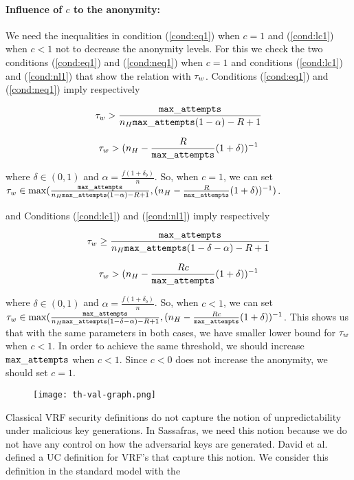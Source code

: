 \paragraph{Influence of $ c $ to the anonymity:} We need the inequalities in condition  (\ref{cond:eq1}) when $ c = 1 $ and (\ref{cond:lc1}) when $ c < 1 $ not to decrease the anonymity levels. For this we check the two conditions (\ref{cond:eq1})  and (\ref{cond:neq1}) when $ c = 1 $ and conditions (\ref{cond:lc1}) and (\ref{cond:nl1}) that show the relation with $ \tau_w $. Conditions (\ref{cond:eq1})  and (\ref{cond:neq1}) imply respectively 

$$\tau_w > \frac{\mathtt{max\_attempts}}{n_H \mathtt{max\_attempts} (1-\alpha)-R +1}$$


$$  \tau_w >({n_H -\frac{R}{\mathtt{max\_attempts}} (1+\delta)})^{-1}$$

where $ \delta \in (0,1) $ and $ \alpha = \frac{f(1+\delta_b)}{n} $. 
So, when $ c = 1 $, we can set  $ \tau_w \in \max( \frac{\mathtt{max\_attempts}}{n_H \mathtt{max\_attempts} (1-\alpha)-R +1}, ({n_H -\frac{R}{\mathtt{max\_attempts}} (1+\delta)})^{-1}) $.

and Conditions  (\ref{cond:lc1})  and (\ref{cond:nl1}) imply respectively 

$$\tau_w \geq \frac{\mathtt{max\_attempts}}{n_H  \mathtt{max\_attempts} (1-\delta-\alpha)-R +1}$$


$$  \tau_w > ({n_H -\frac{Rc}{\mathtt{max\_attempts}} (1+\delta)})^{-1}$$

where $ \delta \in (0,1) $ and $ \alpha = \frac{f(1+\delta_b)}{n} $. 
So, when $ c < 1 $, we can set  $ \tau_w \in \max(\frac{\mathtt{max\_attempts}}{n_H  \mathtt{max\_attempts} (1-\delta-\alpha)-R +1}, ({n_H -\frac{Rc}{\mathtt{max\_attempts}} (1+\delta)})^{-1}  $.
This shows us that with the same parameters in both cases, we have smaller lower bound for $ \tau_w $ when $c < 1 $. In order to achieve the same threshold, we should increase $ \mathtt{max\_attempts} $ when $ c < 1 $. Since $ c < 0$ does not increase the anonymity, we should set $ c = 1 $.


\begin{figure}\centering
	\texttt{[image: th-val-graph.png]}
\end{figure}
Classical VRF security definitions do not capture the notion of unpredictability under malicious key generations. In Sassafras, we need this notion because we do not have any control on how the adversarial keys are generated. David et al. \cite{praos} defined a UC definition for VRF's that capture this notion. We consider this definition in the standard model with the   

